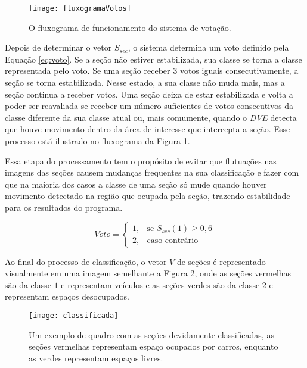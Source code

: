 \begin{figure}
	\centering
	\texttt{[image: fluxogramaVotos]}
	\caption{O fluxograma de funcionamento do sistema de votação.}
	\label{fig:fluxogramaVotos}
	\centering
\end{figure}


Depois de determinar o vetor $S_{sec}$, o sistema determina um voto definido pela Equação \ref{eq:voto}.  Se a seção não estiver estabilizada, sua classe se torna a classe representada pelo voto. Se uma seção receber $3$ votos iguais consecutivamente, a seção se torna estabilizada. Nesse estado, a sua classe não muda mais, mas a seção continua a receber votos. Uma seção deixa de estar estabilizada e volta a poder ser reavaliada se receber um número suficientes de votos consecutivos da classe diferente da sua classe atual ou, mais comumente, quando o \textit{DVE} detecta que houve movimento dentro da área de interesse que intercepta a seção. Esse processo está ilustrado no fluxograma da Figura \ref{fig:fluxogramaVotos}.

Essa etapa do processamento tem o propósito de evitar que flutuações nas imagens das seções causem mudanças frequentes na sua classificação e fazer com que na maioria dos casos a classe de uma seção só mude quando houver movimento detectado na região que ocupada pela seção, trazendo estabilidade para os resultados do programa.

\begin{equation}
Voto= 
\begin{cases}
    1,& \text{se } S_{sec}(1) \geq 0,6\\
    2,& \text{caso contrário}
\end{cases}
\label{eq:voto}
\end{equation}


Ao final do processo de classificação, o vetor $V$ de seções é representado visualmente em uma imagem semelhante a Figura \ref{fig:exemploClassificacao}, onde as seções vermelhas são da classe $1$ e representam veículos e as seções verdes são da classe $2$ e representam espaços desocupados.

\begin{figure}
\centering
\texttt{[image: classificada]}
\centering
\caption{Um exemplo de quadro com as seções devidamente classificadas, as seções vermelhas representam espaço ocupados por carros, enquanto as verdes representam espaços livres.}
\label{fig:exemploClassificacao}
\end{figure}

